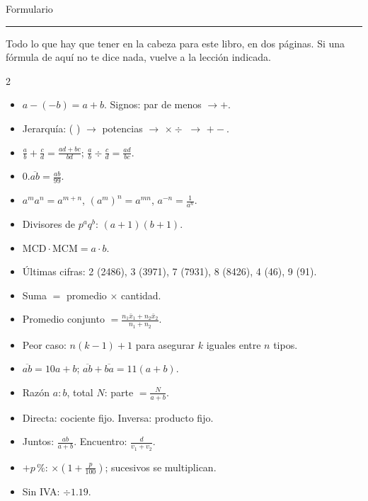 \cleardoublepage
\makeatletter\renewcommand{\zuka@mundoactual}{Formulario}
{\sffamily\fontsize{26}{30}\selectfont\firalight Formulario\par}\vspace{2pt}
{\color{zlime}\rule{18mm}{1.6pt}}\par\vspace{6pt}
{\small\color{zmute}Todo lo que hay que tener en la cabeza para este libro, en dos páginas. Si una fórmula de aquí no te
dice nada, vuelve a la lección indicada.\par}

\begin{multicols}{2}\small
{}
\begin{itemize}
  \item $a - (-b) = a + b$. Signos: par de menos $\to +$.
  \item Jerarquía: ( ) $\to$ potencias $\to$ $\times\div$ $\to$ $+-$.
  \item $\tfrac ab + \tfrac cd = \tfrac{ad + bc}{bd}$; $\tfrac ab \div \tfrac cd = \tfrac{ad}{bc}$.
  \item $0.\overline{ab} = \tfrac{ab}{99}$.
  \item $a^m a^n = a^{m+n}$, $(a^m)^n = a^{mn}$, $a^{-n} = \tfrac{1}{a^n}$.
  \item Divisores de $p^a q^b$: $(a + 1)(b + 1)$.
  \item $\text{MCD}\cdot\text{MCM} = a \cdot b$.
  \item Últimas cifras: 2 (2486), 3 (3971), 7 (7931), 8 (8426), 4 (46), 9 (91).
\end{itemize}

\begin{itemize}
  \item Suma $=$ promedio $\times$ cantidad.
  \item Promedio conjunto $= \tfrac{n_1 \bar x_1 + n_2 \bar x_2}{n_1 + n_2}$.
  \item Peor caso: $n(k - 1) + 1$ para asegurar $k$ iguales entre $n$ tipos.
  \item $\overline{ab} = 10a + b$; $\overline{ab} + \overline{ba} = 11(a + b)$.
\end{itemize}

\begin{itemize}
  \item Razón $a : b$, total $N$: parte $= \tfrac{N}{a + b}$.
  \item Directa: cociente fijo. Inversa: producto fijo.
  \item Juntos: $\tfrac{ab}{a + b}$. Encuentro: $\tfrac{d}{v_1 + v_2}$.
  \item $+p\,\%$: $\times(1 + \tfrac{p}{100})$; sucesivos se multiplican.
  \item Sin IVA: $\div 1.19$.
\end{itemize}


\end{multicols}
